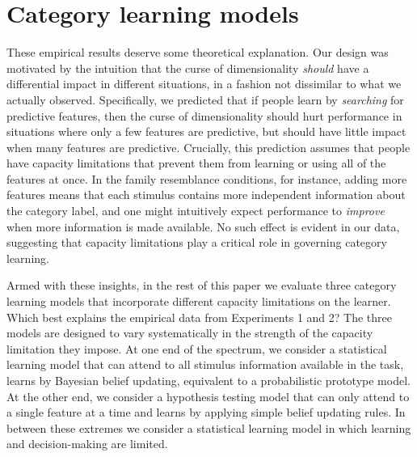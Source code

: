 \documentclass[a4paper, doc, floatsintext]{apa6}
\begin{document}


\section{Category learning models}

These empirical results deserve some theoretical explanation. Our design was motivated by the intuition that the curse of dimensionality \textit{should} have a differential impact in different situations, in a fashion not dissimilar to what we actually observed. Specifically, we predicted that if people learn by \textit{searching} for predictive features, then the curse of dimensionality should hurt performance in situations where only a few features are predictive, but should have little impact when many features are predictive. Crucially, this prediction assumes that people have capacity limitations that prevent them from learning or using all of the features at once. In the family resemblance conditions, for instance, adding more features means that each stimulus contains more independent information about the category label, and one might intuitively expect performance to \textit{improve} when more information is made available. No such effect is evident in our data, suggesting that capacity limitations play a critical role in governing category learning.

Armed with these insights, in the rest of this paper we evaluate three category learning models that incorporate different capacity limitations on the learner. Which best explains the empirical data from Experiments 1 and 2? The three models are designed to vary systematically in the strength of the capacity limitation they impose. At one end of the spectrum, we consider a statistical learning model that can attend to all stimulus information available in the task, learns by Bayesian belief updating, equivalent to a probabilistic prototype model. At the other end, we consider a hypothesis testing model that can only attend to a single feature at a time and learns by applying simple belief updating rules. In between these extremes we consider a statistical learning model in which learning and decision-making are limited.
\end{document}
